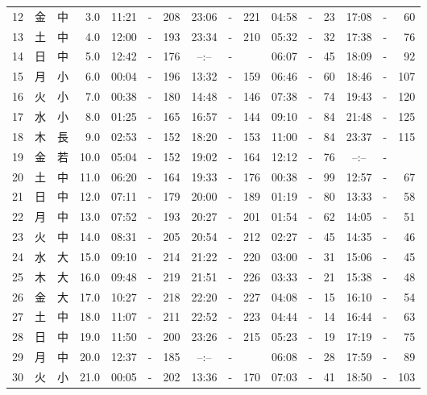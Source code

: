 \documentclass[12pt.a4j]{jsarticle}
\begin{document}
\begin{center}
\begin{table}[ht]
\begin{tabular}{|rc|cr|ccrccr|ccrccr|}
12 & 金 & 中 &  3.0 &  11:21 &-& 208  &  23:06 &-& 221  &   04:58 &-&  23  &   17:08 &-&  60  \\
13 & 土 & 中 &  4.0 &  12:00 &-& 193  &  23:34 &-& 210  &   05:32 &-&  32  &   17:38 &-&  76  \\
14 & 日 & 中 &  5.0 &  12:42 &-& 176  &  --:-- &-&     &   06:07 &-&  45  &   18:09 &-&  92  \\
15 & 月 & 小 &  6.0 &  00:04 &-& 196  &  13:32 &-& 159  &   06:46 &-&  60  &   18:46 &-& 107  \\
16 & 火 & 小 &  7.0 &  00:38 &-& 180  &  14:48 &-& 146  &   07:38 &-&  74  &   19:43 &-& 120  \\
17 & 水 & 小 &  8.0 &  01:25 &-& 165  &  16:57 &-& 144  &   09:10 &-&  84  &   21:48 &-& 125  \\
18 & 木 & 長 &  9.0 &  02:53 &-& 152  &  18:20 &-& 153  &   11:00 &-&  84  &   23:37 &-& 115  \\
19 & 金 & 若 & 10.0 &  05:04 &-& 152  &  19:02 &-& 164  &   12:12 &-&  76  &   --:-- &-&     \\
20 & 土 & 中 & 11.0 &  06:20 &-& 164  &  19:33 &-& 176  &   00:38 &-&  99  &   12:57 &-&  67  \\
21 & 日 & 中 & 12.0 &  07:11 &-& 179  &  20:00 &-& 189  &   01:19 &-&  80  &   13:33 &-&  58  \\
22 & 月 & 中 & 13.0 &  07:52 &-& 193  &  20:27 &-& 201  &   01:54 &-&  62  &   14:05 &-&  51  \\
23 & 火 & 中 & 14.0 &  08:31 &-& 205  &  20:54 &-& 212  &   02:27 &-&  45  &   14:35 &-&  46  \\
24 & 水 & 大 & 15.0 &  09:10 &-& 214  &  21:22 &-& 220  &   03:00 &-&  31  &   15:06 &-&  45  \\
25 & 木 & 大 & 16.0 &  09:48 &-& 219  &  21:51 &-& 226  &   03:33 &-&  21  &   15:38 &-&  48  \\
26 & 金 & 大 & 17.0 &  10:27 &-& 218  &  22:20 &-& 227  &   04:08 &-&  15  &   16:10 &-&  54  \\
27 & 土 & 中 & 18.0 &  11:07 &-& 211  &  22:52 &-& 223  &   04:44 &-&  14  &   16:44 &-&  63  \\
28 & 日 & 中 & 19.0 &  11:50 &-& 200  &  23:26 &-& 215  &   05:23 &-&  19  &   17:19 &-&  75  \\
29 & 月 & 中 & 20.0 &  12:37 &-& 185  &  --:-- &-&     &   06:08 &-&  28  &   17:59 &-&  89  \\
30 & 火 & 小 & 21.0 &  00:05 &-& 202  &  13:36 &-& 170  &   07:03 &-&  41  &   18:50 &-& 103  \\

\end{tabular}
\end{table}
\end{center}
\end{document}
